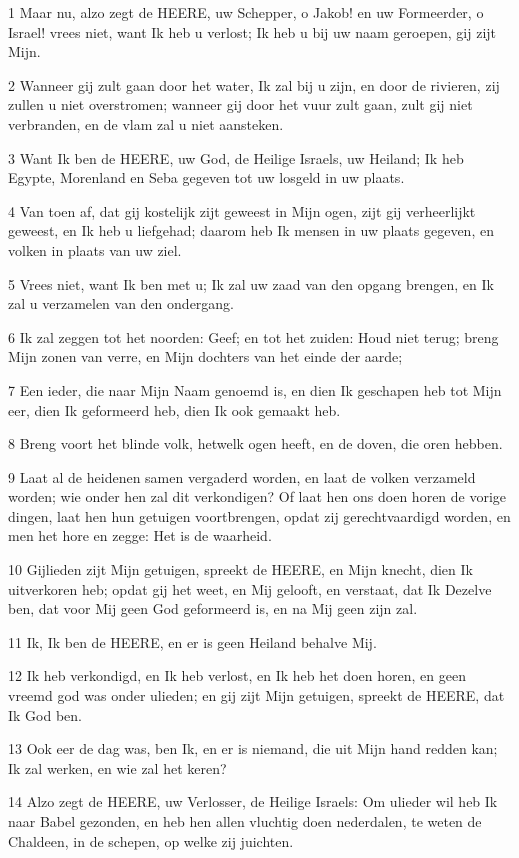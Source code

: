 \par 1 Maar nu, alzo zegt de HEERE, uw Schepper, o Jakob! en uw Formeerder, o Israel! vrees niet, want Ik heb u verlost; Ik heb u bij uw naam geroepen, gij zijt Mijn.
\par 2 Wanneer gij zult gaan door het water, Ik zal bij u zijn, en door de rivieren, zij zullen u niet overstromen; wanneer gij door het vuur zult gaan, zult gij niet verbranden, en de vlam zal u niet aansteken.
\par 3 Want Ik ben de HEERE, uw God, de Heilige Israels, uw Heiland; Ik heb Egypte, Morenland en Seba gegeven tot uw losgeld in uw plaats.
\par 4 Van toen af, dat gij kostelijk zijt geweest in Mijn ogen, zijt gij verheerlijkt geweest, en Ik heb u liefgehad; daarom heb Ik mensen in uw plaats gegeven, en volken in plaats van uw ziel.
\par 5 Vrees niet, want Ik ben met u; Ik zal uw zaad van den opgang brengen, en Ik zal u verzamelen van den ondergang.
\par 6 Ik zal zeggen tot het noorden: Geef; en tot het zuiden: Houd niet terug; breng Mijn zonen van verre, en Mijn dochters van het einde der aarde;
\par 7 Een ieder, die naar Mijn Naam genoemd is, en dien Ik geschapen heb tot Mijn eer, dien Ik geformeerd heb, dien Ik ook gemaakt heb.
\par 8 Breng voort het blinde volk, hetwelk ogen heeft, en de doven, die oren hebben.
\par 9 Laat al de heidenen samen vergaderd worden, en laat de volken verzameld worden; wie onder hen zal dit verkondigen? Of laat hen ons doen horen de vorige dingen, laat hen hun getuigen voortbrengen, opdat zij gerechtvaardigd worden, en men het hore en zegge: Het is de waarheid.
\par 10 Gijlieden zijt Mijn getuigen, spreekt de HEERE, en Mijn knecht, dien Ik uitverkoren heb; opdat gij het weet, en Mij gelooft, en verstaat, dat Ik Dezelve ben, dat voor Mij geen God geformeerd is, en na Mij geen zijn zal.
\par 11 Ik, Ik ben de HEERE, en er is geen Heiland behalve Mij.
\par 12 Ik heb verkondigd, en Ik heb verlost, en Ik heb het doen horen, en geen vreemd god was onder ulieden; en gij zijt Mijn getuigen, spreekt de HEERE, dat Ik God ben.
\par 13 Ook eer de dag was, ben Ik, en er is niemand, die uit Mijn hand redden kan; Ik zal werken, en wie zal het keren?
\par 14 Alzo zegt de HEERE, uw Verlosser, de Heilige Israels: Om ulieder wil heb Ik naar Babel gezonden, en heb hen allen vluchtig doen nederdalen, te weten de Chaldeen, in de schepen, op welke zij juichten.
